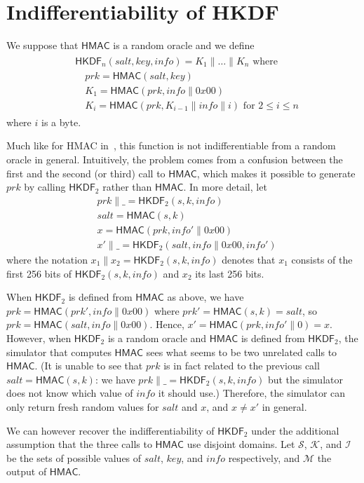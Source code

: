 \documentclass[compsoc, conference, letterpaper, 10pt, times]{IEEEtran}
\newcommand{\HKDF}{\mathsf{HKDF}}
\newcommand{\hkdftwo}{\HKDF_2}
\newcommand{\salt}{\mathit{salt}}
\newcommand{\key}{\mathit{key}}
\newcommand{\info}{\mathit{info}}
\newcommand{\prk}{\mathit{prk}}
\newcommand{\hmac}{\mathsf{HMAC}}
\newcommand{\Ssalt}{\mathcal{S}}
\newcommand{\Skey}{\mathcal{K}}
\newcommand{\Sinfo}{\mathcal{I}}
\newcommand{\Smac}{\mathcal{M}}
\begin{document}
\section{Indifferentiability of HKDF}

We suppose that $\hmac$ is a random oracle and we define
\begin{align}
\begin{split}
&\HKDF_n(\salt,\key,\info) = K_1 \| \dots \| K_n \text{ where}\\
&\quad \prk = \hmac(\salt,\key)\\
&\quad K_1 = \hmac(\prk, \info \| 0x00)\\
&\quad K_i = \hmac(\prk, K_{i-1} \| \info \| i) \text{ for }2 \leq i \leq n
\end{split}\label{eq:hkdf2}
\end{align}
where $i$ is a byte.

Much like for HMAC in~\cite{Dodis12}, this function is not indifferentiable from a random oracle in general. Intuitively, the problem comes from a confusion between the first and the second (or third) call to $\hmac$, which makes it possible to generate $\prk$ by calling $\hkdftwo$ rather than $\hmac$. In more detail, let
\begin{align*}
&\prk \|\_ = \hkdftwo(s,k,\info)\\
&\salt = \hmac(s,k)\\
&x = \hmac(\prk,\info'\|0x00)\\
&x' \|\_ = \hkdftwo(\salt,\info\|0x00,\info')
\end{align*}
where the notation $x_1 \|x_2 = \hkdftwo(s,k,\info)$
denotes that $x_1$ consists of the first 256 bits of $\hkdftwo(s,k,\info)$ 
and $x_2$ its last 256 bits.

When $\hkdftwo$ is defined from $\hmac$ as above, we have 
$\prk = \hmac(\prk', \info\|0x00)$ where $\prk' = \hmac(s,k) = \salt$,
so $\prk = \hmac(\salt,\info\|0x00)$. Hence, $x' = \hmac(\prk,\info'\|0) = x$.
However, when $\hkdftwo$ is a random oracle and $\hmac$ is defined
from $\hkdftwo$, the simulator that computes $\hmac$ sees what seems
to be two unrelated calls to $\hmac$. (It is unable to see that $\prk$
is in fact related to the previous call $\salt = \hmac(s,k)$: we have 
$\prk \|\_ = \hkdftwo(s,k,\info)$ but the simulator does not know which value
of $\info$ it should use.) Therefore, the simulator can only return fresh random
values for $\salt$ and $x$, and $x \neq x'$ in general.

We can however recover the indifferentiability of $\hkdftwo$ under the 
additional assumption that the three calls to $\hmac$ use disjoint domains.
Let $\Ssalt$, $\Skey$, and $\Sinfo$ be the sets of possible values of $\salt$, 
$\key$, and $\info$ respectively, and $\Smac$ the output of $\hmac$.
\end{document}
